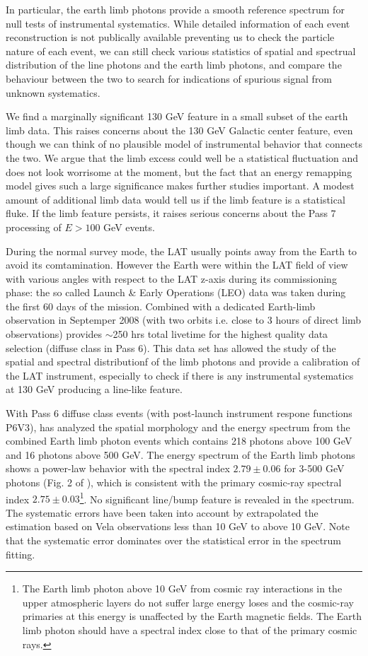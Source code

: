 \documentclass[aps,twocolumn,prd,superscriptaddress,showpacs,nofootinbib,fixfloat]{revtex4}
\begin{document}
In particular, the earth limb photons provide a smooth
reference spectrum for null tests of instrumental
systematics. While detailed information of each event
reconstruction is not publically available preventing us to
check the particle nature of each event, we can still check
various statistics of spatial and spectrual distribution of
the line photons and the earth limb photons, and compare the
behaviour between the two to search for indications of
spurious signal from unknown systematics. 

We find a marginally significant 130 GeV feature in a small
subset of the earth limb data.  This raises concerns about
the 130 GeV Galactic center feature, even though we can
think of no plausible model of instrumental behavior that
connects the two.  We argue that the limb excess could well
be a statistical fluctuation and does not look worrisome at
the moment, but the fact that an energy remapping model
gives such a large significance makes further studies
important. A modest amount of additional limb data
would tell us if the limb feature is a statistical fluke.
If the limb feature persists, it raises serious concerns
about the Pass 7 processing of $E > 100$ GeV events. 



During the normal survey mode, the LAT usually points away
from the Earth to avoid its comtamination. However the Earth
were within the LAT field of view with various angles with
respect to the LAT z-axis during its commissioning phase:
the so called Launch \& Early Operations (LEO) data was
taken during the first 60 days of the mission. Combined with
a dedicated Earth-limb observation in Septemper 2008 (with
two orbits i.e. close to 3 hours of direct limb
observations) provides $\sim$250 hrs total livetime for the
highest quality data selection (diffuse class in Pass
6)\cite{FermiLimb}. This data set has allowed the study of
the spatial and spectral distributionf of the limb photons
and provide a calibration of the LAT instrument, especially
to check if there is any instrumental systematics at 130 GeV
producing a line-like feature.

With Pass 6 diffuse class events (with post-launch
instrument respone functions P6V3), \citep{FermiLimb} has
analyzed the spatial morphology and the energy spectrum from
the combined Earth limb photon events which contains 218
photons above 100 GeV and 16 photons above 500 GeV. The
energy spectrum of the Earth limb photons shows a power-law
behavior with the spectral index $2.79\pm 0.06$ for 3-500
GeV photons (Fig. 2 of \cite{FermiLimb}), which is
consistent with the primary cosmic-ray spectral index
$2.75\pm 0.03$\footnote{The Earth limb photon above 10 GeV
  from cosmic ray interactions in the upper atmospheric
  layers do not suffer large energy loses and the cosmic-ray
  primaries at this energy is unaffected by the Earth
  magnetic fields. The Earth limb photon should have a
  spectral index close to that of the primary cosmic
  rays. }. No significant line/bump feature is revealed in
the spectrum. The systematic errors have been taken into
account by extrapolated the estimation based on Vela
observations less than 10 GeV to above 10 GeV. Note that the
systematic error dominates over the statistical error in the
spectrum fitting.
\end{document}
